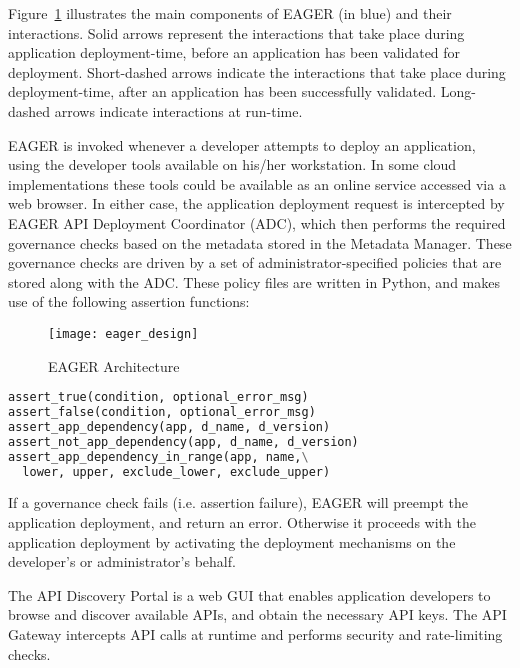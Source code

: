 Figure~\ref{fig:eager_design} illustrates the main components of EAGER (in
blue) and their interactions. Solid arrows represent the interactions that take place
during application deployment-time, before an application has been validated
for deployment. Short-dashed arrows indicate the interactions that take place
during deployment-time, after an application has been successfully validated.
Long-dashed arrows indicate interactions at run-time.

EAGER is invoked whenever a developer attempts to deploy an application, using
the developer tools available on his/her workstation. In some cloud
implementations these tools could be available as an online service accessed
via a web browser. In either case, the application deployment request is
intercepted by EAGER API Deployment Coordinator (ADC), which then performs the 
required governance checks based on the metadata stored in the Metadata Manager.
These governance checks are driven by a set of administrator-specified policies that
are stored along with the ADC. These policy files are written in Python, and makes use of 
the following assertion functions:

\begin{figure}
\centering
\texttt{[image: eager\_design]}
\caption{EAGER Architecture}
\label{fig:eager_design}
\end{figure}

{\footnotesize 
\begin{lstlisting}[language=Python, frame=single]
assert_true(condition, optional_error_msg)
assert_false(condition, optional_error_msg)
assert_app_dependency(app, d_name, d_version)
assert_not_app_dependency(app, d_name, d_version)
assert_app_dependency_in_range(app, name,\
  lower, upper, exclude_lower, exclude_upper)
\end{lstlisting}
}

If a governance check fails (i.e. assertion failure), EAGER will preempt the 
application deployment, and
return an error. Otherwise it proceeds with the application deployment by
activating the deployment mechanisms on the developer's or administrator's
behalf.

The API Discovery Portal is a web GUI that enables application developers to browse and
discover available APIs, and obtain the necessary API keys. The API Gateway intercepts
API calls at runtime and performs security and rate-limiting checks.